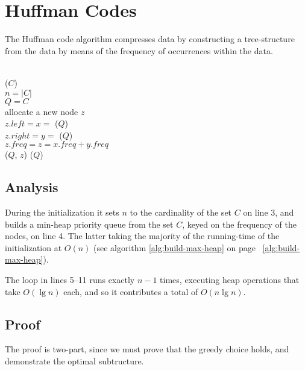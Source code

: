 \section{Huffman Codes}
The Huffman code algorithm compresses data by constructing a tree-structure
from the data by means of the frequency of occurrences within the data.
\\\\
\begin{algorithm}[H]
	
	
	\BlankLine
	
	\HuffmanCode($C$) \\
	\Begin
	{
		$n = |C|$ \\
		$Q = C$ \\
		{
			allocate a new node $z$ \\
			$z.left = x = $ \ExtractMin($Q$) \\
			$z.right = y = $ \ExtractMin($Q$) \\
			$z.freq = z = x.freq + y.freq$ \\
			\Insert($Q$, $z$)
		}
		\Return \ExtractMin($Q$)
	}
\end{algorithm}

\subsection{Analysis}
During the initialization it sets $n$ to the cardinality of the set $C$ on
line 3, and builds a min-heap priority queue from the set $C$, keyed on the
frequency of the nodes, on line 4. The latter taking the majority of the
running-time of the initialization at $O(n)$ (see algorithm
\ref{alg:build-max-heap} on page ~\ref{alg:build-max-heap}).

The loop in lines 5--11 runs exactly $n-1$ times, executing heap operations
that take $O(\lg n)$ each, and so it contributes a total of $O(n \lg n)$.

\newpage
\subsection{Proof}
The proof is two-part, since we must prove that the greedy choice holds, and
demonstrate the optimal subtructure.

